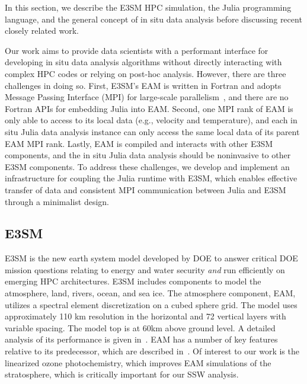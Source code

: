 \documentclass{juliacon}
\begin{document}
In this section, we describe the E3SM HPC simulation, the Julia programming language, and the general concept of in situ data analysis before discussing recent closely related work.





Our work aims to provide data scientists with a performant interface for developing in situ data analysis algorithms without directly interacting with complex HPC codes or relying on post-hoc analysis. However, there are three challenges in doing so. First, E3SM's EAM is written in Fortran and adopts Message Passing Interface (MPI) for large-scale parallelism~\cite{walker1996mpi}, and there are no Fortran APIs for embedding Julia into EAM. Second, one MPI rank of EAM is only able to access to its local data (e.g., velocity and temperature), and each in situ Julia data analysis instance can only access the same local data of its parent EAM MPI rank. Lastly, EAM is compiled and interacts with other E3SM components, and the in situ Julia data analysis should be noninvasive to other E3SM components. To address these challenges, we develop and implement an infrastructure for coupling the Julia runtime with E3SM, which enables effective transfer of data and consistent MPI communication between Julia and E3SM through a minimalist design. 


\subsection{E3SM}

E3SM is the new earth system model developed by DOE to answer critical DOE mission questions relating to energy and water security \emph{and} run efficiently on emerging HPC architectures.  E3SM includes components to model the atmosphere, land, rivers, ocean, and sea ice. The atmosphere component, EAM, utilizes a spectral element discretization on a cubed sphere grid.  The model uses approximately 110 km resolution in the horizontal and 72 vertical layers with variable spacing.  The model top is at 60km above ground level.  A detailed analysis of its performance is given in~\cite{xie2018understanding,zhang2019evaluation,qian2018parametric,rasch2019overview,golaz2019doe}.  EAM has a number of key features relative to its predecessor, which are described in~\cite{golaz2019doe}.  Of interest to our work is the linearized ozone photochemistry, which improves EAM simulations of the stratosphere, which is critically important for our SSW analysis.
\end{document}
